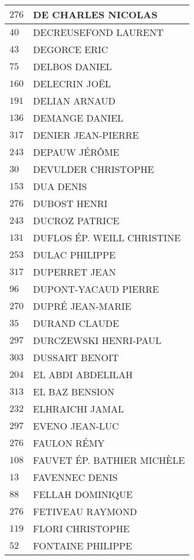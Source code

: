 \begin{xltabular}{\linewidth}{|l|X|}
    \hline
    $276$ & DE CHARLES NICOLAS \\
    \hline
    $40$ & DECREUSEFOND LAURENT \\
    \hline
    $43$ & DEGORCE ERIC \\
    \hline
    $75$ & DELBOS DANIEL \\
    \hline
    $160$ & DELECRIN JOËL \\
    \hline
    $191$ & DELIAN ARNAUD \\
    \hline
    $136$ & DEMANGE DANIEL \\
    \hline
    $317$ & DENIER JEAN-PIERRE \\
    \hline
    $243$ & DEPAUW JÉRÔME \\
    \hline
    $30$ & DEVULDER CHRISTOPHE \\
    \hline
    $153$ & DUA DENIS \\
    \hline
    $276$ & DUBOST HENRI \\
    \hline
    $243$ & DUCROZ PATRICE \\
    \hline
    $131$ & DUFLOS ÉP. WEILL CHRISTINE \\
    \hline
    $253$ & DULAC PHILIPPE \\
    \hline
    $317$ & DUPERRET JEAN \\
    \hline
    $96$ & DUPONT-YACAUD PIERRE \\
    \hline
    $270$ & DUPRÉ JEAN-MARIE \\
    \hline
    $35$ & DURAND CLAUDE \\
    \hline
    $297$ & DURCZEWSKI HENRI-PAUL \\
    \hline
    $303$ & DUSSART BENOIT \\
    \hline
    $204$ & EL ABDI ABDELILAH \\
    \hline
    $313$ & EL BAZ BENSION \\
    \hline
    $232$ & ELHRAICHI JAMAL \\
    \hline
    $297$ & EVENO JEAN-LUC \\
    \hline
    $276$ & FAULON RÉMY \\
    \hline
    $108$ & FAUVET ÉP. BATHIER MICHÈLE \\
    \hline
    $13$ & FAVENNEC DENIS \\
    \hline
    $88$ & FELLAH DOMINIQUE \\
    \hline
    $276$ & FETIVEAU RAYMOND \\
    \hline
    $119$ & FLORI CHRISTOPHE \\
    \hline
    $52$ & FONTAINE PHILIPPE \\

\end{xltabular}
